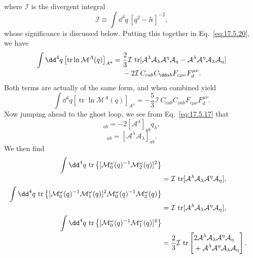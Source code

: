 where $\mathcal I$ is the divergent integral
\begin{equation}
\mathcal I\equiv\int \dd^4q\,[q^2-\ii\epsilon]^{-2},
\label{eq:17.5.24}
\end{equation}
whose significance is discussed below. Putting this together in
Eq.~\eqref{eq:17.5.20}, we have
\begin{align*}
\int \dd^4q\left[\operatorname{tr}\ln\mathcal M^A(q)\right]_{A^4}
={}&\frac23\mathcal I\,\operatorname{tr}
[\mathcal A^\lambda\mathcal A_\lambda\mathcal A^\eta\mathcal A_\eta
-\mathcal A^\lambda\mathcal A^\eta\mathcal A_\lambda\mathcal A_\eta]
\notag\\[-2pt]
&-2\mathcal I\,C_{cab}C_{\dd ab}
F_{c\mu\nu}F_d^{\mu\nu}.
\end{align*}
Both terms are actually of the same form, and when combined yield
\begin{equation}
\int \dd^4q\left[\operatorname{tr}\ln\mathcal M^A(q)\right]_{A^4}
=-\frac53\mathcal I\,C_{cab}C_{\dd ab}
F_{c\mu\nu}F_d^{\mu\nu}.
\label{eq:17.5.25}
\end{equation}
Now jumping ahead to the ghost loop, we see from Eq.~\eqref{eq:17.5.17} that
\begin{equation}
[\mathcal M_1^\omega(q)]_{ab}
=-2[\mathcal A^\lambda]_{ab}q_\lambda,
\label{eq:17.5.26}
\end{equation}
\begin{equation}
[\mathcal M_2^\omega(q)]_{ab}
=[\mathcal A^\lambda\mathcal A_\lambda]_{ab}.
\label{eq:17.5.27}
\end{equation}
We then find
\begin{align*}
\int \dd^4q\,\operatorname{tr}\left\{
[\mathcal M_0^\omega(q)^{-1}\mathcal M_2^\omega(q)]^2\right\}
\notag\\[-2pt]
&=\mathcal I\,\operatorname{tr}
[\mathcal A^\lambda\mathcal A_\lambda\mathcal A^\eta\mathcal A_\eta],\\
\int \dd^4q\,\operatorname{tr}\left\{
[\mathcal M_0^\omega(q)^{-1}\mathcal M_1^\omega(q)]^2
\mathcal M_0^\omega(q)^{-1}\mathcal M_2^\omega(q)\right\}
\notag\\[-2pt]
&=\mathcal I\,\operatorname{tr}
[\mathcal A^\lambda\mathcal A_\lambda\mathcal A^\eta\mathcal A_\eta],\\
\int \dd^4q\,\operatorname{tr}\left\{
[\mathcal M_0^\omega(q)^{-1}\mathcal M_1^\omega(q)]^4\right\}
\notag\\[-2pt]
&=\frac23\mathcal I\,\operatorname{tr}
\left[\begin{aligned}
&2\mathcal A^\lambda\mathcal A_\lambda\mathcal A^\eta\mathcal A_\eta\\[-2pt]
&+\mathcal A^\lambda\mathcal A^\eta\mathcal A_\lambda\mathcal A_\eta
\end{aligned}\right].
\end{align*}
